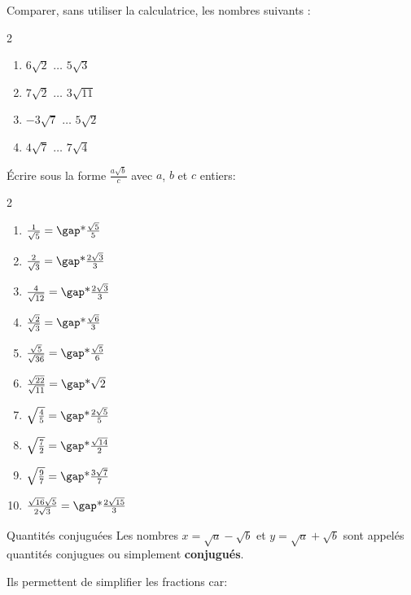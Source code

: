 \documentclass[10pt,a4paper,openany,twoside, eleve]{book}
\begin{document}
\begin{exercicesnofoot}
	\begin{exo}
		Comparer, sans utiliser la calculatrice, les nombres suivants :
		\begin{multicols}{2}
			\begin{enumerate}[label=$\alph*)$]
				\item $6\sqrt{2}$ $\dots$ $5\sqrt{3}$
				\item $7\sqrt{2}$ $\dots$ $3\sqrt{11}$
				\item $-3\sqrt{7}$ $\dots$ $5\sqrt{2}$
				\item $4\sqrt{7}$ $\dots$ $7\sqrt{4}$
	\end{enumerate}
	\end{multicols}

	\end{exo}
	\sectionexo{Fractions}
	\begin{exo}
	Écrire sous la forme $\frac{a\sqrt{b}}{c}$ avec $a$, $b$ et $c$ entiers:
	\begin{multicols}{2}
		\begin{enumerate}[label={}]
			\item $\frac{1}{\sqrt{5}} = \troum{\frac{\sqrt{5}}{5}}$
			\item $\frac{2}{\sqrt{3}} = \troum{\frac{2\sqrt{3}}{3}}$
			\item $\frac{4}{\sqrt{12}} = \troum{\frac{2\sqrt{3}}{3}}$
			\item $\frac{\sqrt{2}}{\sqrt{3}} = \troum{\frac{\sqrt{6}}{3}}$
			\item $\frac{\sqrt{5}}{\sqrt{36}} = \troum{\frac{\sqrt{5}}{6}}$
			\item $\frac{\sqrt{22}}{\sqrt{11}} = \troum{\sqrt{2}}$
			\item $\sqrt{\frac{4}{5}} = \troum{\frac{2\sqrt{5}}{5}}$
			\item $\sqrt{\frac{7}{2}} = \troum{\frac{\sqrt{14}}{2}}$
			\item $\sqrt{\frac{9}{7}} = \troum{\frac{3\sqrt{7}}{7}}$
			\item $\frac{\sqrt{16}\sqrt{5}}{2\sqrt{3}} = \troum{\frac{2\sqrt{15}}{3}}$
		\end{enumerate}
	\end{multicols}
	\end{exo}

	\begin{defi}{Quantités conjuguées}{}
		Les nombres $x=\sqrt{a}-\sqrt{b}$ et $y=\sqrt{a}+\sqrt{b}$ sont appelés quantités conjugues ou simplement \textbf{conjugués}.

		Ils permettent de simplifier les fractions car:


\end{defi}
\end{exercicesnofoot}
\end{document}
